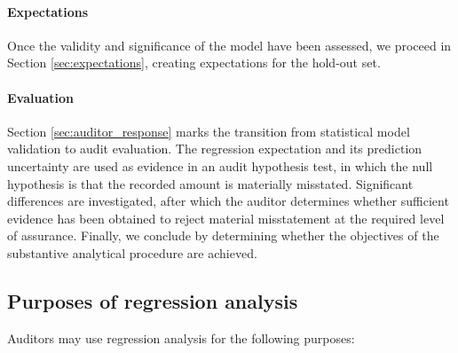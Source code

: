 
\paragraph{Expectations} %
\label{par:expectations}

Once the validity and significance of the model have been assessed, we proceed in Section \ref{sec:expectations}, creating expectations for the hold-out set. 


\paragraph{Evaluation} %
\label{par:evaluation}

Section \ref{sec:auditor_response} marks the transition from statistical model validation to audit evaluation. The regression expectation and its prediction uncertainty are used as evidence in an audit hypothesis test, in which the null hypothesis is that the recorded amount is materially misstated. Significant differences are investigated, after which the auditor determines whether sufficient evidence has been obtained to reject material misstatement at the required level of assurance. Finally, we conclude by determining whether the objectives of the substantive analytical procedure are achieved.



\subsection{Purposes of regression analysis} %
\label{sub:purposes_of_regression_analysis}

Auditors may use regression analysis for the following purposes:

